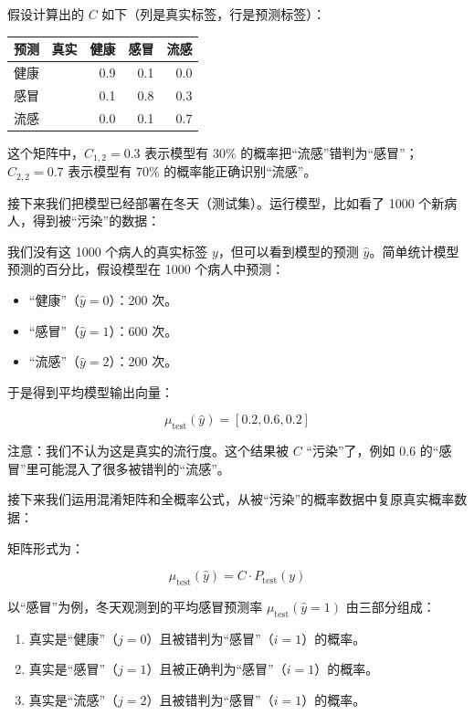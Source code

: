 假设计算出的 \(C\) 如下（列是真实标签，行是预测标签）：

\begin{longtable}[]{@{}lrrr@{}}
\toprule
预测 ~真实 & 健康 & 感冒 & 流感 \\
\midrule
\endhead
健康 & 0.9 & 0.1 & 0.0 \\
感冒 & 0.1 & 0.8 & 0.3 \\
流感 & 0.0 & 0.1 & 0.7 \\
\bottomrule
\end{longtable}

这个矩阵中，\(C_{1,2}=0.3\) 表示模型有 30\% 的概率把``流感''错判为``感冒''；\(C_{2,2}=0.7\) 表示模型有 70\% 的概率能正确识别``流感''。

接下来我们把模型已经部署在冬天（测试集）。运行模型，比如看了 1000 个新病人，得到被``污染''的数据：

我们没有这 1000 个病人的真实标签 \(y\)，但可以看到模型的预测 \(\hat{y}\)。简单统计模型预测的百分比，假设模型在 1000 个病人中预测：

\begin{itemize}
\tightlist
\item
  ``健康''（\(\hat{y}=0\)）：200 次。
\item
  ``感冒''（\(\hat{y}=1\)）：600 次。
\item
  ``流感''（\(\hat{y}=2\)）：200 次。
\end{itemize}

于是得到平均模型输出向量：

\[
\mu_{\mathrm{test}}(\hat{y})=[0.2,0.6,0.2]
\]

注意：我们不认为这是真实的流行度。这个结果被 \(C\) ``污染''了，例如 \(0.6\) 的``感冒''里可能混入了很多被错判的``流感''。

接下来我们运用混淆矩阵和全概率公式，从被``污染''的概率数据中复原真实概率数据：

矩阵形式为：

\[
\mu_{\mathrm{test}}(\hat{y})=C\cdot P_{\mathrm{test}}(y)
\]

以``感冒''为例，冬天观测到的平均感冒预测率 \(\mu_{\mathrm{test}}(\hat{y}=1)\) 由三部分组成：

\begin{enumerate}
\def\labelenumi{\arabic{enumi}.}
\tightlist
\item
  真实是``健康''（\(j=0\)）且被错判为``感冒''（\(i=1\)）的概率。
\item
  真实是``感冒''（\(j=1\)）且被正确判为``感冒''（\(i=1\)）的概率。
\item
  真实是``流感''（\(j=2\)）且被错判为``感冒''（\(i=1\)）的概率。
\end{enumerate}

